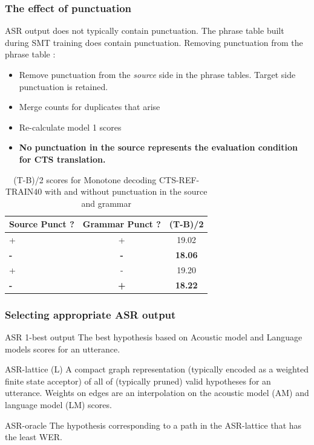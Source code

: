 \documentclass{beamer}
\begin{document}
\begin{frame}
\frametitle{The effect of punctuation}
ASR output does not typically contain punctuation. The phrase 
table built during SMT training does contain punctuation. 
Removing punctuation from the phrase table : 
\begin{itemize}
	\item Remove punctuation from the \textit{source} side in the phrase tables. Target side punctuation is retained.
	\item Merge counts for duplicates that arise
	\item Re-calculate model 1 scores
	\item \textbf{No punctuation in the source represents the evaluation condition for CTS translation.}
\end{itemize}

\begin{table}
\begin{center}
\begin{tabular}{| l | c | c |}
  \hline 
  \textbf{Source Punct ? } & \textbf{Grammar Punct ? } & \textbf{(T-B)/2} \\ \hline
  + & + & 19.02\\
  \hline
  \textbf{-} & \textbf{-} & \textbf{18.06}\\
  \hline
  + & - & 19.20\\
  \hline
  \textbf{-} & \textbf{+} & \textbf{18.22}\\
  \hline
\end{tabular}
\caption{(T-B)/2 scores for Monotone decoding CTS-REF-TRAIN40 with and without punctuation in the source and grammar}
\label{tab:cross-bleu}
\end{center}
\end{table}
\end{frame}

\begin{frame}
\frametitle{Selecting appropriate ASR output}

\begin{block}{ASR 1-best output}
The best hypothesis based on Acoustic model and Language models scores for an utterance.
\end{block}
\begin{block}{ASR-lattice (L)}
A compact graph representation (typically encoded as a weighted finite state acceptor) of all of (typically pruned)
valid hypotheses for an utterance. Weights on edges are an interpolation on the acoustic model (AM) and language 
model (LM) scores.
\end{block}
\begin{block}{ASR-oracle}
The hypothesis corresponding to a path in the ASR-lattice that has the least WER.
\end{block}
\end{frame}
\end{document}
